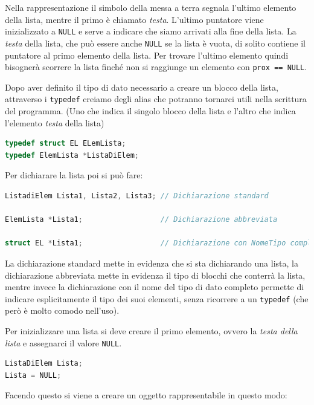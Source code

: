 \documentclass[
  paper=a4,
  oneside  ,captions=tableheading
]{scrbook}
\newcommand{\passthrough}[1]{#1}
\begin{document}
Nella rappresentazione il simbolo della messa a terra segnala l'ultimo
elemento della lista, mentre il primo è chiamato \emph{testa}. L'ultimo
puntatore viene inizializzato a \passthrough{\lstinline!NULL!} e serve a
indicare che siamo arrivati alla fine della lista. La \emph{testa} della
lista, che può essere anche \passthrough{\lstinline!NULL!} se la lista è
vuota, di solito contiene il puntatore al primo elemento della lista.
Per trovare l'ultimo elemento quindi bisognerà scorrere la lista finché
non si raggiunge un elemento con \passthrough{\lstinline!prox == NULL!}.

Dopo aver definito il tipo di dato necessario a creare un blocco della
lista, attraverso i \passthrough{\lstinline!typedef!} creiamo degli
alias che potranno tornarci utili nella scrittura del programma. (Uno
che indica il singolo blocco della lista e l'altro che indica l'elemento
\emph{testa} della lista)

\begin{lstlisting}[language=C]
typedef struct EL ELemLista;
typedef ElemLista *ListaDiElem; 
\end{lstlisting}

Per dichiarare la lista poi si può fare:

\begin{lstlisting}[language=C]
ListadiElem Lista1, Lista2, Lista3; // Dichiarazione standard

ElemLista *Lista1;                  // Dichiarazione abbreviata

struct EL *Lista1;                  // Dichiarazione con NomeTipo completo
\end{lstlisting}

La dichiarazione standard mette in evidenza che si sta dichiarando una
lista, la dichiarazione abbreviata mette in evidenza il tipo di blocchi
che conterrà la lista, mentre invece la dichiarazione con il nome del
tipo di dato completo permette di indicare esplicitamente il tipo dei
suoi elementi, senza ricorrere a un \passthrough{\lstinline!typedef!}
(che però è molto comodo nell'uso).

Per inizializzare una lista si deve creare il primo elemento, ovvero la
\emph{testa della lista} e assegnarci il valore
\passthrough{\lstinline!NULL!}.

\begin{lstlisting}[language=C]
ListaDiElem Lista;
Lista = NULL; 
\end{lstlisting}

Facendo questo si viene a creare un oggetto rappresentabile in questo
modo:
\end{document}
